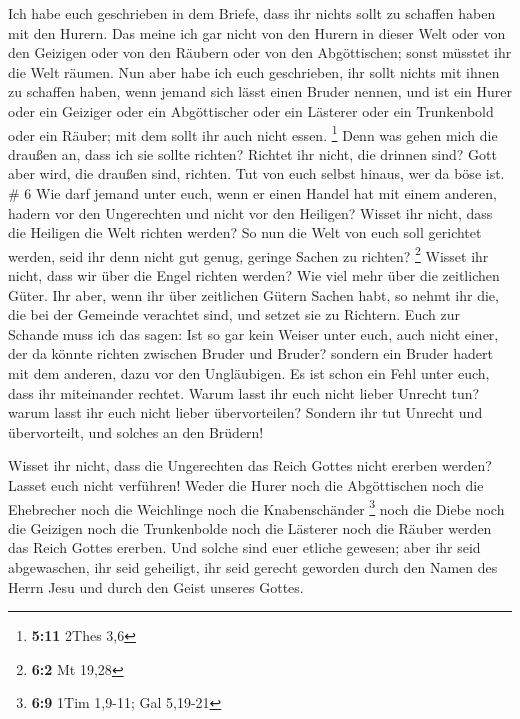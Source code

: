  Ich habe euch geschrieben in dem Briefe, dass ihr nichts
sollt zu schaffen haben mit den Hurern.  Das meine ich gar
nicht von den Hurern in dieser Welt oder von den Geizigen oder von den
Räubern oder von den Abgöttischen; sonst müsstet ihr die Welt räumen.
 Nun aber habe ich euch geschrieben, ihr sollt nichts mit
ihnen zu schaffen haben, wenn jemand sich lässt einen Bruder nennen, und
ist ein Hurer oder ein Geiziger oder ein Abgöttischer oder ein Lästerer
oder ein Trunkenbold oder ein Räuber; mit dem sollt ihr auch nicht
essen. \footnote{\textbf{5:11} 2Thes 3,6}  Denn was gehen
mich die draußen an, dass ich sie sollte richten? Richtet ihr nicht, die
drinnen sind?  Gott aber wird, die draußen sind, richten.
Tut von euch selbst hinaus, wer da böse ist. \# 6  Wie darf
jemand unter euch, wenn er einen Handel hat mit einem anderen, hadern
vor den Ungerechten und nicht vor den Heiligen?  Wisset ihr
nicht, dass die Heiligen die Welt richten werden? So nun die Welt von
euch soll gerichtet werden, seid ihr denn nicht gut genug, geringe
Sachen zu richten? \footnote{\textbf{6:2} Mt 19,28}  Wisset
ihr nicht, dass wir über die Engel richten werden? Wie viel mehr über
die zeitlichen Güter.  Ihr aber, wenn ihr über zeitlichen
Gütern Sachen habt, so nehmt ihr die, die bei der Gemeinde verachtet
sind, und setzet sie zu Richtern.  Euch zur Schande muss ich
das sagen: Ist so gar kein Weiser unter euch, auch nicht einer, der da
könnte richten zwischen Bruder und Bruder?  sondern ein
Bruder hadert mit dem anderen, dazu vor den Ungläubigen.  Es
ist schon ein Fehl unter euch, dass ihr miteinander rechtet. Warum lasst
ihr euch nicht lieber Unrecht tun? warum lasst ihr euch nicht lieber
übervorteilen?  Sondern ihr tut Unrecht und übervorteilt,
und solches an den Brüdern!

 Wisset ihr nicht, dass die Ungerechten das Reich Gottes
nicht ererben werden? Lasset euch nicht verführen! Weder die Hurer noch
die Abgöttischen noch die Ehebrecher noch die Weichlinge noch die
Knabenschänder \footnote{\textbf{6:9} 1Tim 1,9-11; Gal 5,19-21}
 noch die Diebe noch die Geizigen noch die Trunkenbolde
noch die Lästerer noch die Räuber werden das Reich Gottes ererben.
 Und solche sind euer etliche gewesen; aber ihr seid
abgewaschen, ihr seid geheiligt, ihr seid gerecht geworden durch den
Namen des Herrn Jesu und durch den Geist unseres Gottes.

